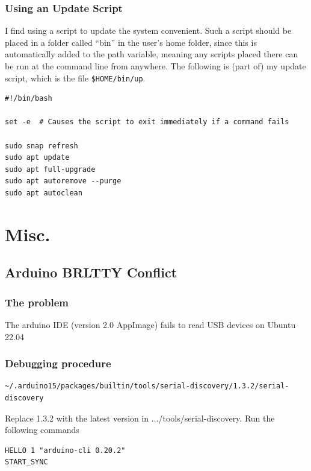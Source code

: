 \documentclass[a4paper, 12pt]{article}
\begin{document}
\subsubsection{Using an Update Script}
I find using a script to update the system convenient. Such a script should be placed in a folder called
``bin'' in the user's home folder, since this is automatically added to the path variable, meaning any
scripts placed there can be run at the command line from anywhere. The following is (part of) my update script,
which is the file \texttt{\$HOME/bin/up}.

\begin{lstlisting}
#!/bin/bash

set -e  # Causes the script to exit immediately if a command fails

sudo snap refresh
sudo apt update
sudo apt full-upgrade
sudo apt autoremove --purge
sudo apt autoclean

\end{lstlisting}

\section{Misc.}

\subsection{Arduino BRLTTY Conflict}

\subsubsection{The problem}

The arduino IDE (version 2.0 AppImage) fails to read USB devices on Ubuntu 22.04

\subsubsection{Debugging procedure}

\begin{lstlisting}
~/.arduino15/packages/builtin/tools/serial-discovery/1.3.2/serial-discovery
\end{lstlisting}

Replace 1.3.2 with the latest version in .../tools/serial-discovery.
Run the following commands

\begin{lstlisting}
HELLO 1 "arduino-cli 0.20.2"
START_SYNC    
\end{lstlisting}
\end{document}
